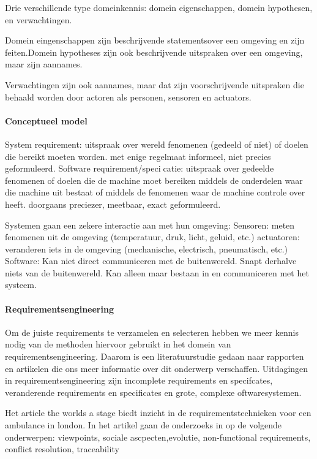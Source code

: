 Drie verschillende type domeinkennis: domein eigenschappen, domein hypothesen, en verwachtingen. 

Domein eingenschappen  zijn beschrijvende statementsover een omgeving en zijn feiten.Domein hypotheses  zijn ook beschrijvende uitspraken over een omgeving, maar zijn aannames. 

Verwachtingen zijn ook aannames, maar dat zijn voorschrijvende uitspraken die behaald worden door actoren als personen, sensoren en actuators. 

  
\paragraph{Conceptueel model}



System requirement:
uitspraak over wereld fenomenen (gedeeld of niet) of doelen
die bereikt moeten worden.
met enige regelmaat informeel, niet precies geformuleerd.
Software requirement/specicatie:
uitspraak over gedeelde fenomenen of doelen die de machine
moet bereiken middels de onderdelen waar die machine uit
bestaat of middels de fenomenen waar de machine controle
over heeft.
doorgaans preciezer, meetbaar, exact geformuleerd.


Systemen gaan een zekere interactie aan met hun omgeving:
Sensoren: meten fenomenen uit de omgeving (temperatuur,
druk, licht, geluid, etc.)
actuatoren: veranderen iets in de omgeving (mechanische,
electrisch, pneumatisch, etc.)
Software:
Kan niet direct communiceren met de buitenwereld.
Snapt derhalve niets van de buitenwereld.
Kan alleen maar bestaan in en communiceren met het
systeem.


\paragraph{Requirementsengineering}

Om de juiste requirements te verzamelen en selecteren hebben we meer kennis nodig van de methoden hiervoor gebruikt in het domein van requirementsengineering. Daarom is een literatuurstudie gedaan naar rapporten en artikelen die ons meer informatie over dit onderwerp verschaffen.
 Uitdagingen in requirementsengineering zijn incomplete requirements en specifcates, veranderende requirements en specificates en grote, complexe oftwaresystemen.
 
 Het article the worlds a stage biedt inzicht in de requirementstechnieken voor een ambulance in london. In het artikel gaan de onderzoeks in op de volgende onderwerpen: 
 viewpoints, sociale ascpecten,evolutie, non-functional requirements, conflict resolution, traceability
 
